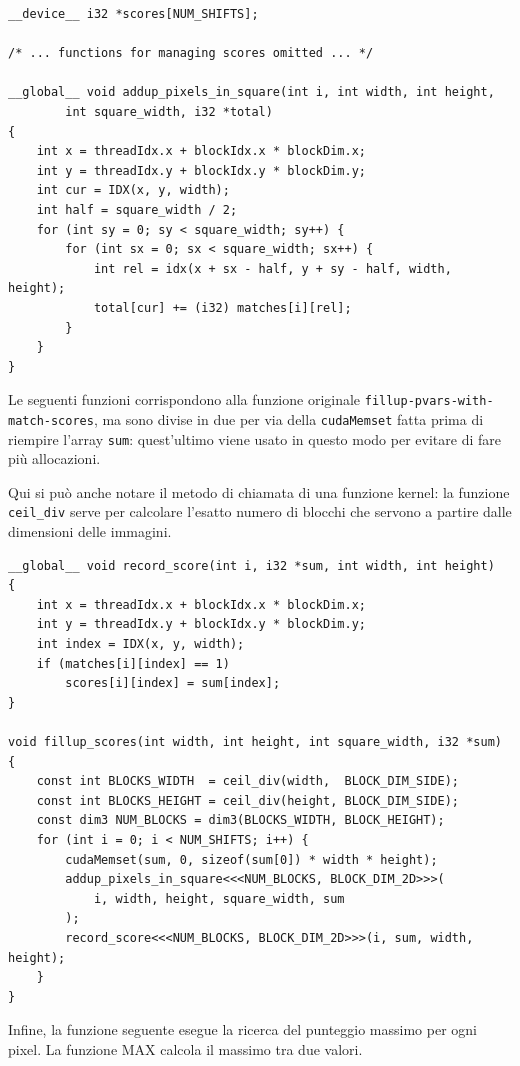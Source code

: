 \documentclass[12pt,a4paper,openright,twoside]{report}
\begin{document}
\begin{lstlisting}[style=mystyle]
__device__ i32 *scores[NUM_SHIFTS];

/* ... functions for managing scores omitted ... */

__global__ void addup_pixels_in_square(int i, int width, int height,
        int square_width, i32 *total)
{
    int x = threadIdx.x + blockIdx.x * blockDim.x;
    int y = threadIdx.y + blockIdx.y * blockDim.y;
    int cur = IDX(x, y, width);
    int half = square_width / 2;
    for (int sy = 0; sy < square_width; sy++) {
        for (int sx = 0; sx < square_width; sx++) {
            int rel = idx(x + sx - half, y + sy - half, width, height);
            total[cur] += (i32) matches[i][rel];
        }
    }
}
\end{lstlisting}

Le seguenti funzioni corrispondono alla funzione originale \verb|fillup-pvars-with-match-scores|, ma sono divise in due per via della \verb|cudaMemset| fatta prima di riempire l'array \verb|sum|: quest'ultimo viene usato in questo modo per evitare di fare più allocazioni.

Qui si può anche notare il metodo di chiamata di una funzione kernel: la funzione \verb|ceil_div| serve per calcolare l'esatto numero di blocchi che servono a partire dalle dimensioni delle immagini.

\begin{lstlisting}[style=mystyle]
__global__ void record_score(int i, i32 *sum, int width, int height)
{
    int x = threadIdx.x + blockIdx.x * blockDim.x;
    int y = threadIdx.y + blockIdx.y * blockDim.y;
    int index = IDX(x, y, width);
    if (matches[i][index] == 1)
        scores[i][index] = sum[index];
}

void fillup_scores(int width, int height, int square_width, i32 *sum)
{
    const int BLOCKS_WIDTH  = ceil_div(width,  BLOCK_DIM_SIDE);
    const int BLOCKS_HEIGHT = ceil_div(height, BLOCK_DIM_SIDE);
    const dim3 NUM_BLOCKS = dim3(BLOCKS_WIDTH, BLOCK_HEIGHT);
    for (int i = 0; i < NUM_SHIFTS; i++) {
        cudaMemset(sum, 0, sizeof(sum[0]) * width * height);
        addup_pixels_in_square<<<NUM_BLOCKS, BLOCK_DIM_2D>>>(
            i, width, height, square_width, sum
        );
        record_score<<<NUM_BLOCKS, BLOCK_DIM_2D>>>(i, sum, width, height);
    }
}
\end{lstlisting}

Infine, la funzione seguente esegue la ricerca del punteggio massimo per ogni pixel. La funzione MAX calcola il massimo tra due valori.
\end{document}
